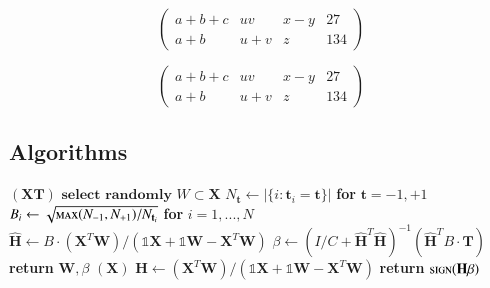 \documentclass[twocolumn, switch]{article} %
\begin{document}
\begin{equation}
\left(
\begin{array}{cccr}
a+b+c & uv & x-y & 27\\
a+b & u+v & z & 134
\end{array}\right)
\end{equation}

\begin{equation}
\left( \begin{array}{c|c|c|r}
a+b+c & uv & x-y & 27\\ \hline
a+b & u+v & z & 134
\end{array}\right)
\end{equation}


\subsection{Algorithms}
\lipsum[88]

\begin{algorithm}[H]
\caption{Cite from IEEE}\label{alg:alg1}
\begin{algorithmic}
\STATE 
{}$(\mathbf{X} \mathbf{T})$
\STATE \hspace{0.5cm}$ \textbf{select randomly } W \subset \mathbf{X}  $
\STATE \hspace{0.5cm}$ N_\mathbf{t} \gets | \{ i : \mathbf{t}_i = \mathbf{t} \} | $ \textbf{ for } $ \mathbf{t}= -1,+1 $
\STATE \hspace{0.5cm}$ B_i \gets \sqrt{ \textsc{max}(N_{-1},N_{+1}) / N_{\mathbf{t}_i} } $ \textbf{ for } $ i = 1,...,N $
\STATE \hspace{0.5cm}$ \hat{\mathbf{H}} \gets  B \cdot (\mathbf{X}^T\textbf{W})/( \mathbb{1}\mathbf{X} + \mathbb{1}\textbf{W} - \mathbf{X}^T\textbf{W} ) $
\STATE \hspace{0.5cm}$ \beta \gets \left ( I/C + \hat{\mathbf{H}}^T\hat{\mathbf{H}} \right )^{-1}(\hat{\mathbf{H}}^T B\cdot \mathbf{T})  $
\STATE \hspace{0.5cm}\textbf{return}  $\textbf{W},  \beta $
\STATE 
{}$(\mathbf{X} )$
\STATE \hspace{0.5cm}$ \mathbf{H} \gets  (\mathbf{X}^T\textbf{W} )/( \mathbb{1}\mathbf{X}  + \mathbb{1}\textbf{W}- \mathbf{X}^T\textbf{W}  ) $
\STATE \hspace{0.5cm}\textbf{return}  $\textsc{sign}( \mathbf{H} \beta )$
\end{algorithmic}
\label{alg1}
\end{algorithm}
\end{document}
